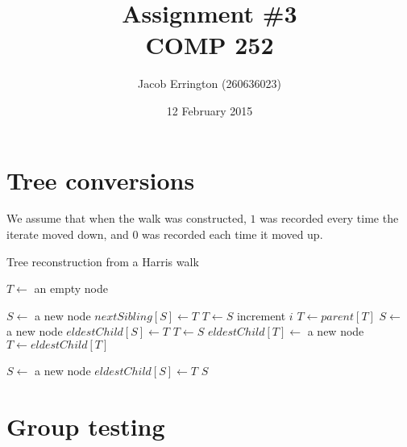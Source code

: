 \documentclass{article}
\author{Jacob Errington (260636023)}
\date{12 February 2015}
\title{Assignment \#3\\COMP 252}
\begin{document}
\maketitle

\section{Tree conversions}

We assume that when the walk was constructed, $1$ was recorded every time the
iterate moved down, and $0$ was recorded each time it moved up.

\begin{algorithm}[H]
    \caption{Tree reconstruction from a Harris walk}
    \begin{algorithmic}
            \State $T \gets $ an empty node

                        \State $S \gets$ a new node
                        \State $nextSibling[S] \gets T$
                        \State $T \gets S$
                        \State increment $i$
                    \Else
                            \State $T \gets parent[T]$
                        \Else
                            \State $S \gets$ a new node
                            \State $eldestChild[S] \gets T$
                            \State $T \gets S$
                        \EndIf
                    \EndIf
                \Else
                    \State $eldestChild[T] \gets$ a new node
                    \State $T \gets eldestChild[T]$
                \EndIf
            \EndFor

            \State $S \gets$ a new node
            \State $eldestChild[S] \gets T$
            \State \Return $S$
        \EndFunction
    \end{algorithmic}
\end{algorithm}

\section{Group testing}
\end{document}
